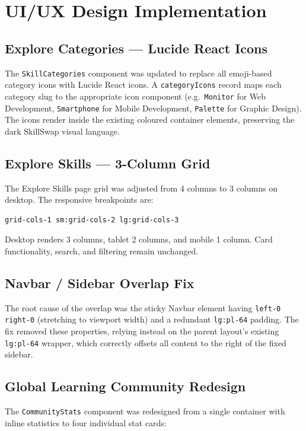 \documentclass[12pt,a4paper]{report}
\begin{document}
\section{UI/UX Design Implementation}

\subsection{Explore Categories --- Lucide React Icons}
The \texttt{SkillCategories} component was updated to replace all emoji-based
category icons with Lucide React icons.  A \texttt{categoryIcons} record maps
each category slug to the appropriate icon component (e.g.\ \texttt{Monitor}
for Web Development, \texttt{Smartphone} for Mobile Development, \texttt{Palette}
for Graphic Design).  The icons render inside the existing coloured container
elements, preserving the dark SkillSwap visual language.

\subsection{Explore Skills --- 3-Column Grid}
The Explore Skills page grid was adjusted from 4 columns to 3 columns on
desktop.  The responsive breakpoints are:

\begin{lstlisting}
grid-cols-1 sm:grid-cols-2 lg:grid-cols-3
\end{lstlisting}

\noindent Desktop renders 3 columns, tablet 2 columns, and mobile 1 column.
Card functionality, search, and filtering remain unchanged.

\subsection{Navbar / Sidebar Overlap Fix}
The root cause of the overlap was the sticky Navbar element having
\texttt{left-0 right-0} (stretching to viewport width) and a redundant
\texttt{lg:pl-64} padding.  The fix removed these properties, relying instead
on the parent layout's existing \texttt{lg:pl-64} wrapper, which correctly
offsets all content to the right of the fixed sidebar.

\subsection{Global Learning Community Redesign}
The \texttt{CommunityStats} component was redesigned from a single container
with inline statistics to four individual stat cards:
\end{document}
